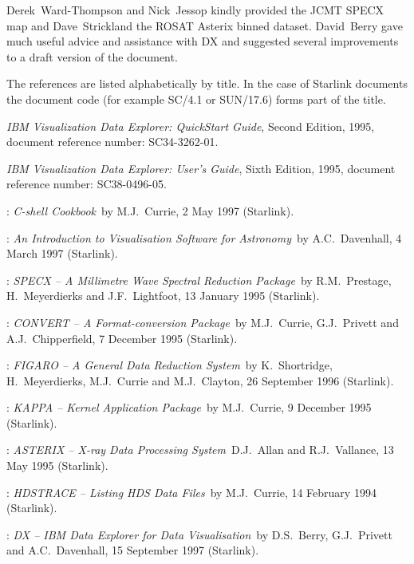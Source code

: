 Derek~Ward-Thompson and Nick~Jessop kindly provided the JCMT SPECX map and
Dave~Strickland the ROSAT Asterix binned dataset.  David~Berry gave much
useful advice and assistance with DX and suggested several improvements to
a draft version of the document.


\begin{thebibliography}{99}

  \item[~] The references are listed alphabetically by title.  In the
   case of Starlink documents the document code (for example SC/4.1
   or SUN/17.6) forms part of the title.

   {\it IBM Visualization Data Explorer: QuickStart
   Guide}, Second Edition, 1995, document reference number:
   SC34-3262-01.

   {\it IBM Visualization Data Explorer: User's Guide},
   Sixth Edition, 1995, document reference number: SC38-0496-05.

   :
   {\it C-shell Cookbook}\, by M.J.~Currie, 2 May 1997 (Starlink).

   :
   {\it An Introduction to Visualisation Software for Astronomy}\,
   by A.C.~Davenhall, 4 March 1997 (Starlink).

   :
   {\it SPECX -- A Millimetre Wave Spectral Reduction Package}\, by
   R.M.~Prestage, H.~Meyerdierks and    J.F.~Lightfoot, 13 January 1995
   (Starlink).

   :
   {\it CONVERT -- A Format-conversion Package}\, by M.J.~Currie,
   G.J.~Privett and A.J.~Chipperfield, 7 December 1995 (Starlink).

   : 
   {\it FIGARO -- A General Data Reduction System}\, by K.~Shortridge,
   H.~Meyerdierks, M.J.~Currie and M.J.~Clayton, 26 September 1996
   (Starlink).

   :
   {\it KAPPA -- Kernel Application Package}\, by M.J.~Currie,
   9 December 1995 (Starlink).

   :
   {\it ASTERIX -- X-ray Data Processing System}\,
   D.J.~Allan and R.J.~Vallance, 13 May 1995 (Starlink).

   :
   {\it HDSTRACE -- Listing HDS Data Files}\, by M.J.~Currie,
   14 February 1994 (Starlink).

   :
   {\it DX -- IBM Data Explorer for Data Visualisation}\, by D.S.~Berry,
   G.J.~Privett and A.C.~Davenhall, 15 September 1997 (Starlink).

\end{thebibliography}


\typeout{  }
\typeout{*****************************************************}
\typeout{  }
\typeout{  }
\typeout{*****************************************************}
\typeout{  }


